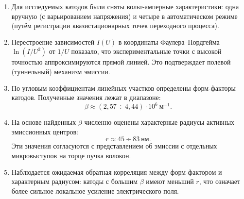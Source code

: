 \documentclass[12pt, a4paper]{article}
\begin{document}
\begin{enumerate}
    \item Для исследуемых катодов были сняты вольт-амперные характеристики: одна вручную (с варьированием напряжения) и четыре в автоматическом режиме (путём регистрации квазистационарных точек переходного процесса).
    \item Перестроение зависимостей $I(U)$ в координаты Фаулера--Нордгейма $\ln(I/U^2)$ от $1/U$ показало, что экспериментальные точки с высокой точностью аппроксимируются прямой линией. Это подтверждает полевой (туннельный) механизм эмиссии.
    \item По угловым коэффициентам линейных участков определены форм-факторы катодов. Полученные значения лежат в диапазоне:
    \begin{equation*}
        \beta \approx (2{,}57 \div 4{,}44) \cdot 10^{6}~\text{м}^{-1}.
    \end{equation*}
    \item На основе найденных $\beta$ численно оценены характерные радиусы активных эмиссионных центров:
    \begin{equation*}
        r \approx 45 \div 83~\text{нм}.
    \end{equation*}
    Эти значения согласуются с представлением об эмиссии с отдельных микровыступов на торце пучка волокон.
    \item Наблюдается ожидаемая обратная корреляция между форм-фактором и характерным радиусом: катоды с большим $\beta$ имеют меньший $r$, что означает более сильное локальное усиление электрического поля.
\end{enumerate}
\end{document}
